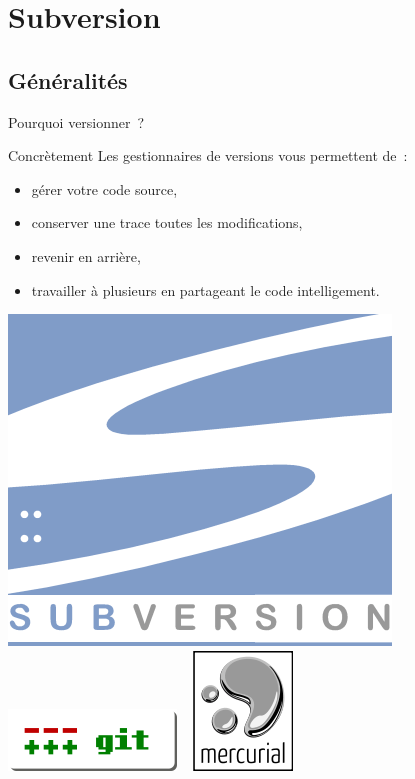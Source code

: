 
\section{Subversion}

\subsection{Généralités}
\begin{frame}{Pourquoi versionner~?}
  \begin{alertblock}{Concrètement}
    Les gestionnaires de versions vous permettent de~:
    \begin{itemize}
      \item gérer votre code source,
      \item conserver une trace toutes les modifications,
      \item revenir en arrière,
      \item travailler à plusieurs en partageant le code intelligement.
    \end{itemize}
  \end{alertblock}
  \begin{center}
    \includegraphics[scale=3]{images/logo_svn} ~
    \includegraphics[scale=0.7]{images/logo_git} ~
    \includegraphics[scale=0.6]{images/logo_hg}

\end{center}
\end{frame}
